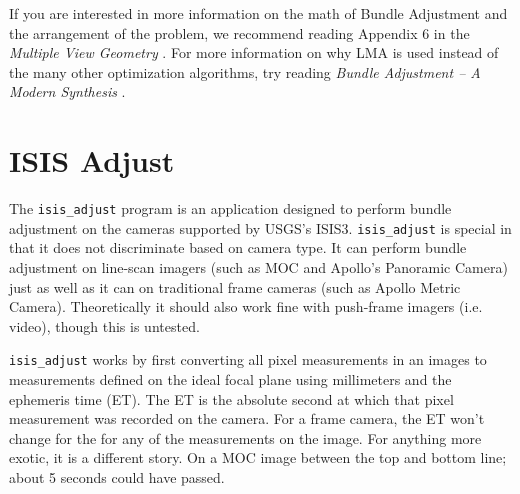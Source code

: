 If you are interested in more information on the math of Bundle
Adjustment and the arrangement of the problem, we recommend reading
Appendix 6 in the {\em Multiple View Geometry} \cite{hartley04}.
For more information on why LMA is used instead of the many other
optimization algorithms, try reading {\em Bundle Adjustment – A Modern
Synthesis} \cite{triggs00}.

\section{ISIS Adjust}

The \texttt{isis\_adjust} program is an application designed to
perform bundle adjustment on the cameras supported by USGS's
ISIS3. \texttt{isis\_adjust} is special in that it does not
discriminate based on camera type. It can perform bundle adjustment on
line-scan imagers (such as MOC and Apollo's Panoramic Camera) just as
well as it can on traditional frame cameras (such as Apollo Metric
Camera). Theoretically it should also work fine with push-frame
imagers (i.e. video), though this is untested.

\texttt{isis\_adjust} works by first converting all pixel measurements
in an images to measurements defined on the ideal focal
plane using millimeters and the ephemeris time (ET). The ET is the
absolute second at which that pixel measurement was recorded on the camera. 
For a frame camera, the ET won't change for the for
any of the measurements on the image. For anything more exotic, it is
a different story. On a MOC image between the top and bottom line;
about 5 seconds could have passed.

\begin{figure}
\vspace{-30pt}
\begin{center}
\end{center}
\vspace{-30pt}
\end{figure}

